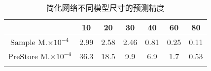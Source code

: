 \begin{center}
\begin{table}
	\caption{简化网络不同模型尺寸的预测精度}
	\begin{tabular}{ccccccc}
	\toprule
		 							&	10		&	20		&	30		&	40		&	60		&	80		\\	\midrule
	Sample M.\(\times 10^{-4}\)	&	2.99	&	2.58	&	2.46	&	0.81	&	0.25	&	0.11	 \\	\hline
	PreStore M.\(\times 10^{-4}\)&	36.3	&	18.5	&	9.9		&	6.9		&	1.7		&	0.53	\\	
	\bottomrule
	\label{tab:second}
	\end{tabular}
\end{table}
\vspace{-3em}
\end{center}
